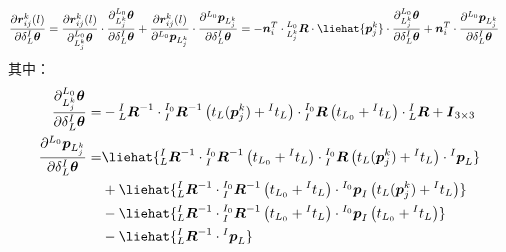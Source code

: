 \begin{equation}
  \begin{aligned}
    \label{equ:jacobian_rot_li}
    \frac{\partial \boldsymbol{r}_{ij}^k(l)}{\partial \delta {^{I}_{L}\boldsymbol{\theta}}} & =
    \frac{\partial \boldsymbol{r}_{ij}^k(l)}{\partial  {^{L_0}_{L_j^k}\boldsymbol{\theta}}}\cdot
    \frac{\partial {^{L_0}_{L_j^k}\boldsymbol{\theta}}}{\partial \delta {^{I}_{L}\boldsymbol{\theta}}}+
    \frac{\partial \boldsymbol{r}_{ij}^k(l)}{\partial {^{L_0}\boldsymbol{p}_{L_j^k}}}\cdot
    \frac{\partial {^{L_0}\boldsymbol{p}_{L_j^k}}}{\partial \delta {^{I}_{L}\boldsymbol{\theta}}}=
    -\boldsymbol{n}_i^T\cdot{^{L_0}_{L_j^k}\boldsymbol{R}\cdot\liehat{\boldsymbol{p}_j^k}}
    \cdot\frac{\partial {^{L_0}_{L_j^k}\boldsymbol{\theta}}}{\partial \delta {^{I}_{L}\boldsymbol{\theta}}}
    +\boldsymbol{n}_i^T\cdot\frac{\partial {^{L_0}\boldsymbol{p}_{L_j^k}}}{\partial \delta {^{I}_{L}\boldsymbol{\theta}}}
  \end{aligned}
\end{equation}
其中：
\begin{equation*}
  \begin{aligned}
    \frac{\partial {^{L_0}_{L_j^k}\boldsymbol{\theta}}}{\partial \delta {^{I}_{L}\boldsymbol{\theta}}}= &
    -{^{I}_{L}\boldsymbol{R}^{-1}}
    \cdot{{^{I_0}_{I}}\boldsymbol{R}^{-1}\left( t_{L}(\boldsymbol{p}_j^k)+{^{I}t_L}\right) }
    \cdot{{^{I_0}_{I}}\boldsymbol{R}\left( t_{L_0}+{^{I}t_L}\right) }
    \cdot{{^{I}_{L}}\boldsymbol{R}}+\boldsymbol{I}_{3\times 3}                                            \\
    \frac{\partial {^{L_0}\boldsymbol{p}_{L_j^k}}}{\partial \delta {^{I}_{L}\boldsymbol{\theta}}}=      &
    \liehat{{{^{I}_{L}}\boldsymbol{R}^{-1}}\cdot{{^{I_0}_{I}}\boldsymbol{R}^{-1}\left( t_{L_0}+{^{I}t_L}\right) }\cdot{{^{I_0}_{I}}\boldsymbol{R}\left( t_{L}(\boldsymbol{p}_j^k)+{^{I}t_L}\right) }
    \cdot{^{I}\boldsymbol{p}_L}}
    \\&+\liehat{{{^{I}_{L}}\boldsymbol{R}^{-1}}\cdot{{^{I_0}_{I}}\boldsymbol{R}^{-1}\left( t_{L_0}+{^{I}t_L}\right) }
    \cdot{^{I_0}\boldsymbol{p}_I\left( t_{L}(\boldsymbol{p}_j^k)+{^{I}t_L}\right)}}
    \\&-\liehat{{{^{I}_{L}}\boldsymbol{R}^{-1}}
      \cdot{{^{I_0}_{I}}\boldsymbol{R}^{-1}\left( t_{L_0}+{^{I}t_L}\right) }\cdot{^{I_0}\boldsymbol{p}_I\left( t_{L_0}+{^{I}t_L}\right)}}
    \\&-\liehat{{{^{I}_{L}}\boldsymbol{R}^{-1}}\cdot{^{I}\boldsymbol{p}_L}}
  \end{aligned}
\end{equation*}
